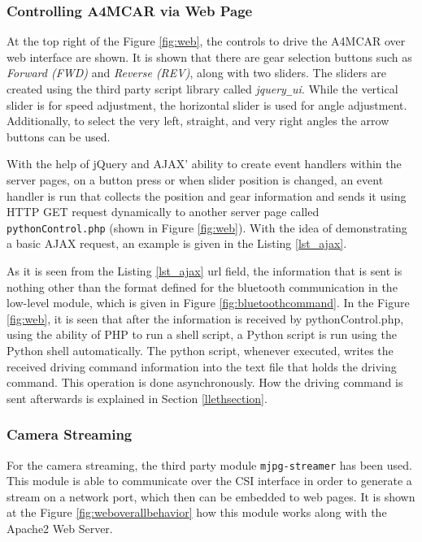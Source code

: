 \subsubsection{Controlling A4MCAR via Web Page}
At the top right of the Figure \ref{fig:web}, the controls to drive the A4MCAR over web interface are shown. It is shown that there are gear selection buttons such as \textit{Forward (FWD)} and \textit{Reverse (REV)}, along with two sliders. The sliders are created using the third party script library called \textit{jquery\texttt{\_}ui}. While the vertical slider is for speed adjustment, the horizontal slider is used for angle adjustment. Additionally, to select the very left, straight, and very right angles the arrow buttons can be used. 

With the help of jQuery and AJAX' ability to create event handlers within the server pages, on a button press or when slider position is changed, an event handler is run that collects the position and gear information and sends it using HTTP GET request dynamically to another server page called \texttt{pythonControl.php} (shown in Figure \ref{fig:web}). With the idea of demonstrating a basic AJAX request, an example is given in the Listing \ref{lst_ajax}.



As it is seen from the Listing \ref{lst_ajax} url field, the information that is sent is nothing other than the format defined for the bluetooth communication in the low-level module, which is given in Figure \ref{fig:bluetoothcommand}. In the Figure \ref{fig:web}, it is seen that after the information is received by pythonControl.php, using the ability of PHP to run a shell script, a Python script is run using the Python shell automatically. The python script, whenever executed, writes the received driving command information into the text file that holds the driving command. This operation is done asynchronously. How the driving command is sent afterwards is explained in Section \ref{llethsection}.
\subsubsection{Camera Streaming}
For the camera streaming, the third party module \texttt{mjpg-streamer} \cite{mjpgstreamergithub} has been used. This module is able to communicate over the CSI interface in order to generate a stream on a network port, which then can be embedded to web pages. It is shown at the Figure \ref{fig:weboverallbehavior} how this module works along with the Apache2 Web Server. 

